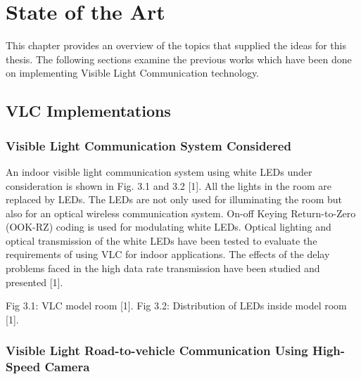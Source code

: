
\chapter{State of the Art} %

\label{SoA} %


This chapter provides an overview of the topics that supplied the ideas for this thesis. The
following sections examine the previous works which have been done on implementing
Visible Light Communication technology.


\section{VLC Implementations}

\subsection{Visible Light Communication System Considered}

An indoor visible light communication system using white LEDs under consideration is
shown in Fig. 3.1 and 3.2 [1]. All the lights in the room are replaced by LEDs. The LEDs
are not only used for illuminating the room but also for an optical wireless
communication system. On-off Keying Return-to-Zero (OOK-RZ) coding is used for
modulating white LEDs. Optical lighting and optical transmission of the white LEDs
have been tested to evaluate the requirements of using VLC for indoor applications. The
effects of the delay problems faced in the high data rate transmission have been studied
and presented [1].

Fig 3.1: VLC model room [1]. Fig 3.2: Distribution of LEDs inside model room [1].

\subsection{Visible Light Road-to-vehicle Communication Using High-Speed Camera}

